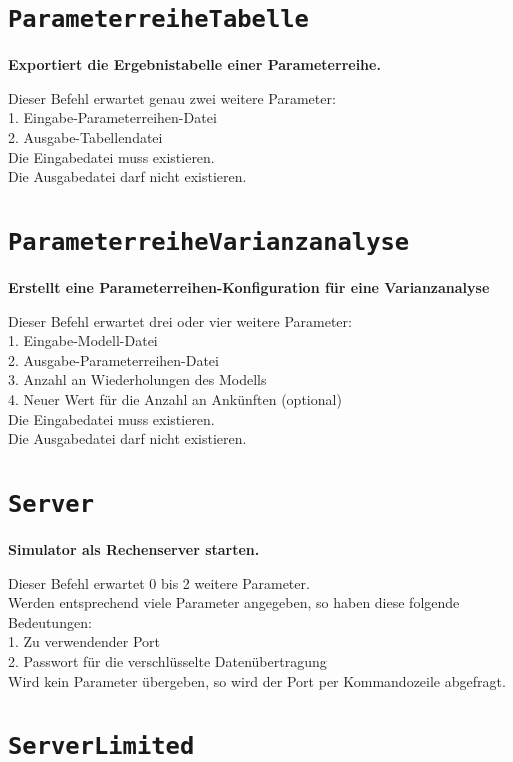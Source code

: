 \section{\texttt{ParameterreiheTabelle}}

\textbf{Exportiert die Ergebnistabelle einer Parameterreihe.}

Dieser Befehl erwartet genau zwei weitere Parameter:\\
1. Eingabe-Parameterreihen-Datei\\
2. Ausgabe-Tabellendatei\\
Die Eingabedatei muss existieren.\\
Die Ausgabedatei darf nicht existieren.

\section{\texttt{ParameterreiheVarianzanalyse}}

\textbf{Erstellt eine Parameterreihen-Konfiguration für eine Varianzanalyse}

Dieser Befehl erwartet drei oder vier weitere Parameter:\\
1. Eingabe-Modell-Datei\\
2. Ausgabe-Parameterreihen-Datei\\
3. Anzahl an Wiederholungen des Modells\\
4. Neuer Wert für die Anzahl an Ankünften (optional)\\
Die Eingabedatei muss existieren.\\
Die Ausgabedatei darf nicht existieren.

\section{\texttt{Server}}

\textbf{Simulator als Rechenserver starten.}

Dieser Befehl erwartet 0 bis 2 weitere Parameter.\\
Werden entsprechend viele Parameter angegeben, so haben diese folgende Bedeutungen:\\
1. Zu verwendender Port\\
2. Passwort für die verschlüsselte Datenübertragung\\
Wird kein Parameter übergeben, so wird der Port per Kommandozeile abgefragt.

\section{\texttt{ServerLimited}}

